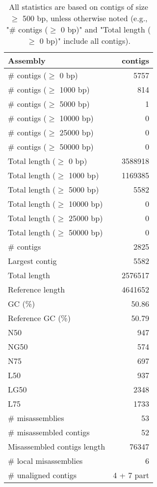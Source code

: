 \documentclass[12pt,a4paper]{article}
\begin{document}
\begin{table}[ht]
\begin{center}
\caption{All statistics are based on contigs of size $\geq$ 500 bp, unless otherwise noted (e.g., "\# contigs ($\geq$ 0 bp)" and "Total length ($\geq$ 0 bp)" include all contigs).}
\begin{tabular}{|l*{1}{|r}|}
\hline
Assembly & contigs \\ \hline
\# contigs ($\geq$ 0 bp) & 5757 \\ \hline
\# contigs ($\geq$ 1000 bp) & 814 \\ \hline
\# contigs ($\geq$ 5000 bp) & 1 \\ \hline
\# contigs ($\geq$ 10000 bp) & 0 \\ \hline
\# contigs ($\geq$ 25000 bp) & 0 \\ \hline
\# contigs ($\geq$ 50000 bp) & 0 \\ \hline
Total length ($\geq$ 0 bp) & 3588918 \\ \hline
Total length ($\geq$ 1000 bp) & 1169385 \\ \hline
Total length ($\geq$ 5000 bp) & 5582 \\ \hline
Total length ($\geq$ 10000 bp) & 0 \\ \hline
Total length ($\geq$ 25000 bp) & 0 \\ \hline
Total length ($\geq$ 50000 bp) & 0 \\ \hline
\# contigs & 2825 \\ \hline
Largest contig & 5582 \\ \hline
Total length & 2576517 \\ \hline
Reference length & 4641652 \\ \hline
GC (\%) & 50.86 \\ \hline
Reference GC (\%) & 50.79 \\ \hline
N50 & 947 \\ \hline
NG50 & 574 \\ \hline
N75 & 697 \\ \hline
L50 & 937 \\ \hline
LG50 & 2348 \\ \hline
L75 & 1733 \\ \hline
\# misassemblies & 53 \\ \hline
\# misassembled contigs & 52 \\ \hline
Misassembled contigs length & 76347 \\ \hline
\# local misassemblies & 6 \\ \hline
\# unaligned contigs & 4 + 7 part \\ \hline

\end{tabular}
\end{center}
\end{table}
\end{document}
